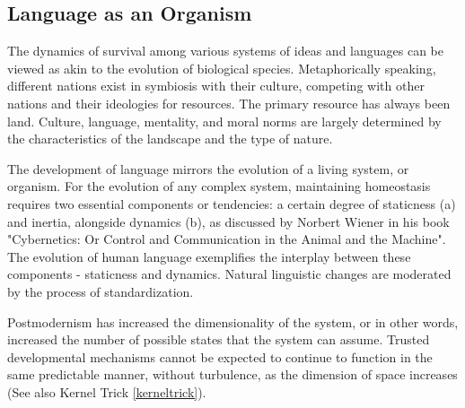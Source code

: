 \documentclass[11pt,a4]{article}
\begin{document}
\subsection{Language as an Organism}
    The dynamics of survival among various systems of ideas and languages can be viewed as akin to the
    evolution of biological species. Metaphorically speaking, different nations exist in symbiosis with
    their culture, competing with other nations and their ideologies for resources.
    The primary resource has always been land. Culture, language, mentality, and moral norms are largely
    determined by the characteristics of the landscape and the type of nature.

    \par
    The development of language mirrors the evolution of a living system, or organism. For the evolution
    of any complex system, maintaining homeostasis requires two essential components or tendencies:
    a certain degree of staticness (a) and inertia, alongside dynamics (b), as discussed by Norbert
    Wiener in his book "Cybernetics: Or Control and Communication in the Animal and the Machine"\cite{Wiener}.
    The evolution of human language exemplifies the interplay between these components - staticness and dynamics.
    Natural linguistic changes are moderated by the process of standardization.

    Postmodernism has increased the dimensionality of the system, or in other words,
    increased the number of possible states that the system can assume.
    Trusted developmental mechanisms cannot be expected to continue to function
    in the same predictable manner, without turbulence,
    as the dimension of space increases (See also Kernel Trick  \ref{kerneltrick}).
\end{document}
